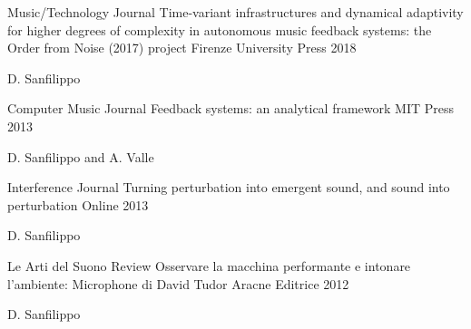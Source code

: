\begin{cventries}
  \cventry
    {Music/Technology Journal} %
    {Time-variant infrastructures and dynamical adaptivity for higher
degrees of complexity in autonomous music feedback systems: the Order from Noise (2017)
project} %
    {Firenze University Press} %
    {2018} %
    {
      \begin{cvitems} %
        \item {D. Sanfilippo}
      \end{cvitems}
    }

  \cventry
    {Computer Music Journal} %
    {Feedback systems: an analytical framework} %
    {MIT Press} %
    {2013} %
    {
      \begin{cvitems} %
        \item {D. Sanfilippo and A. Valle}
      \end{cvitems}
    }

  \cventry
    {Interference Journal} %
    {Turning perturbation into emergent sound, and sound into perturbation} %
    {Online} %
    {2013} %
    {
      \begin{cvitems} %
        \item {D. Sanfilippo}
      \end{cvitems}
    }

  \cventry
    {Le Arti del Suono Review} %
    {Osservare la macchina performante e intonare l’ambiente: Microphone di David Tudor} %
    {Aracne Editrice} %
    {2012} %
    {
      \begin{cvitems} %
        \item {D. Sanfilippo}
      \end{cvitems}
    }

\end{cventries}
